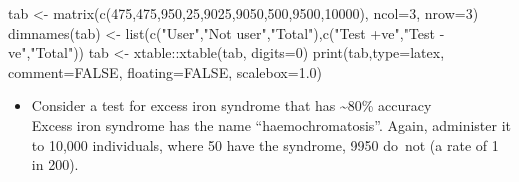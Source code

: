 \documentclass[
  10pt,
  b5paper]{book}
\newenvironment{Shaded}{\begin{snugshade}}{\end{snugshade}}
\newcommand{\AttributeTok}[1]{\textcolor[rgb]{0.77,0.63,0.00}{#1}}
\newcommand{\ConstantTok}[1]{\textcolor[rgb]{0.00,0.00,0.00}{#1}}
\newcommand{\DecValTok}[1]{\textcolor[rgb]{0.00,0.00,0.81}{#1}}
\newcommand{\FloatTok}[1]{\textcolor[rgb]{0.00,0.00,0.81}{#1}}
\newcommand{\FunctionTok}[1]{\textcolor[rgb]{0.00,0.00,0.00}{#1}}
\newcommand{\NormalTok}[1]{#1}
\newcommand{\OtherTok}[1]{\textcolor[rgb]{0.56,0.35,0.01}{#1}}
\newcommand{\SpecialCharTok}[1]{\textcolor[rgb]{0.00,0.00,0.00}{#1}}
\newcommand{\StringTok}[1]{\textcolor[rgb]{0.31,0.60,0.02}{#1}}
\providecommand{\tightlist}{%
  \setlength{\itemsep}{0pt}\setlength{\parskip}{0pt}}
\begin{document}
\begin{Shaded}
\begin{Highlighting}[]
\NormalTok{tab }\OtherTok{\textless{}{-}} \FunctionTok{matrix}\NormalTok{(}\FunctionTok{c}\NormalTok{(}\DecValTok{475}\NormalTok{,}\DecValTok{475}\NormalTok{,}\DecValTok{950}\NormalTok{,}\DecValTok{25}\NormalTok{,}\DecValTok{9025}\NormalTok{,}\DecValTok{9050}\NormalTok{,}\DecValTok{500}\NormalTok{,}\DecValTok{9500}\NormalTok{,}\DecValTok{10000}\NormalTok{), }\AttributeTok{ncol=}\DecValTok{3}\NormalTok{, }\AttributeTok{nrow=}\DecValTok{3}\NormalTok{)}
\FunctionTok{dimnames}\NormalTok{(tab) }\OtherTok{\textless{}{-}} \FunctionTok{list}\NormalTok{(}\FunctionTok{c}\NormalTok{(}\StringTok{"User"}\NormalTok{,}\StringTok{"Not user"}\NormalTok{,}\StringTok{"Total"}\NormalTok{),}\FunctionTok{c}\NormalTok{(}\StringTok{"Test +ve"}\NormalTok{,}\StringTok{"Test {-}ve"}\NormalTok{,}\StringTok{"Total"}\NormalTok{))}
\NormalTok{tab }\OtherTok{\textless{}{-}}\NormalTok{ xtable}\SpecialCharTok{::}\FunctionTok{xtable}\NormalTok{(tab, }\AttributeTok{digits=}\DecValTok{0}\NormalTok{)}
\FunctionTok{print}\NormalTok{(tab,}\AttributeTok{type=}\StringTok{\textquotesingle{}latex\textquotesingle{}}\NormalTok{, }\AttributeTok{comment=}\ConstantTok{FALSE}\NormalTok{, }\AttributeTok{floating=}\ConstantTok{FALSE}\NormalTok{, }\AttributeTok{scalebox=}\FloatTok{1.0}\NormalTok{)}
\end{Highlighting}
\end{Shaded}


\begin{itemize}
\tightlist
\item
  Consider a test for excess iron syndrome that has \textasciitilde80\% accuracy\\
  Excess iron syndrome has the name ``haemochromatosis''. Again,
  administer it to 10,000 individuals, where 50 have the syndrome,
  9950 do~not (a rate of 1 in 200).
\end{itemize}
\end{document}
